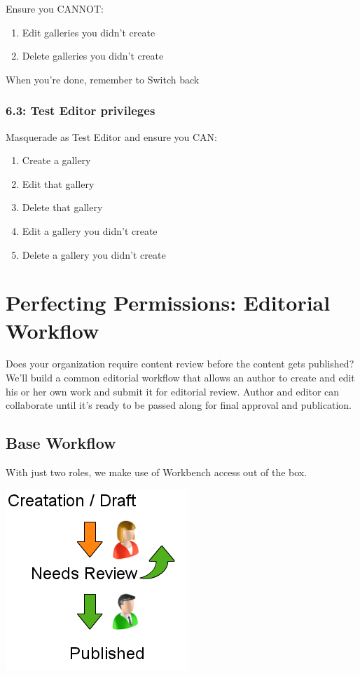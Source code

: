 \documentclass[letterpaper,10pt,english]{sphinxmanual}
\begin{document}
Ensure you CANNOT:
\begin{enumerate}
\item {} 
Edit galleries you didn’t create

\item {} 
Delete galleries you didn’t create

\end{enumerate}

When you’re done, remember to Switch back


\subsection{6.3: Test Editor privileges}
\label{slides:test-editor-privileges}
Masquerade as Test Editor and ensure you CAN:
\begin{enumerate}
\item {} 
Create a gallery

\item {} 
Edit that gallery

\item {} 
Delete that gallery

\item {} 
Edit a gallery you didn’t create

\item {} 
Delete a gallery you didn’t create

\end{enumerate}


\chapter{Perfecting Permissions: Editorial Workflow}
\label{workbench::doc}\label{workbench:perfecting-permissions-editorial-workflow}
Does your organization require content review before the content gets published? We'll build a common editorial workflow that allows an author to create and edit his or her own work and submit it for editorial review. Author and editor can collaborate until it's ready to be passed along for final approval and publication.


\section{Base Workflow}
\label{workbench:base-workflow}
With just two roles, we make use of Workbench access out of the box.

{\includegraphics{workflow_simple.png}\hfill}
\end{document}
